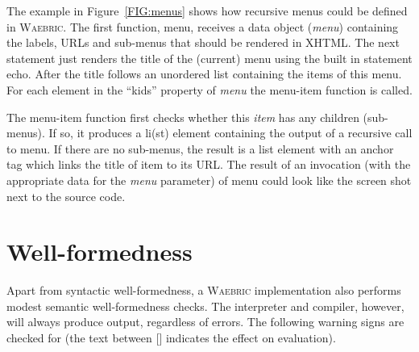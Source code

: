 \documentclass[a4paper]{article}
\def\waebric{\textsc{Waebric}\xspace}
\def\Waebric{\textsc{Waebric}\xspace}
\def\Var#1{\textit{#1}}
\begin{document}
The example in Figure~\ref{FIG:menus} shows how recursive menus could
be defined in \Waebric. The first function, menu, receives a data
object (\Var{menu}) containing the labels, URLs and sub-menus that
should be rendered in XHTML. The next statement just renders the title
of the (current) menu using the built in statement echo. After
the title follows an unordered list containing the items of this
menu. For each element in the ``kids'' property of \Var{menu} the
menu-item function is called.

The menu-item function first checks whether this \Var{item} has any
children (sub-menus). If so, it produces a li(st) element containing
the output of a recursive call to menu. If there are no sub-menus,
the result is a list element with an anchor tag which links the title
of item to its URL. The result of an invocation (with the appropriate
data for the \textit{menu} parameter) of menu could look like the
screen shot next to the source code.


\section{Well-formedness}

Apart from syntactic well-formedness, a \waebric implementation also
performs modest semantic well-formedness checks. The interpreter and
compiler, however, will always produce output, regardless of
errors. The following warning signs are checked for (the text between
[] indicates the effect on evaluation).
\end{document}
